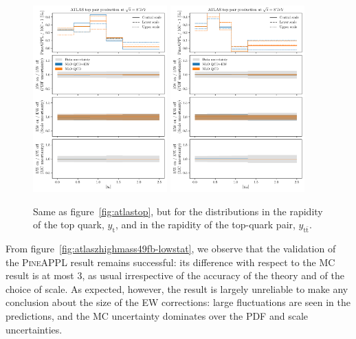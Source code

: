 \begin{figure}[!p]
    \centering
    \includegraphics[width=0.46\textwidth]{figures/pineappl_ATLAS_TTB_DIFF_8TEV_LJ_TRAP}
    \includegraphics[width=0.46\textwidth]{figures/pineappl_ATLAS_TTB_DIFF_8TEV_LJ_TTRAP}\\
    \caption{Same as figure~\ref{fig:atlastop}, but for the distributions
      in the rapidity of the top quark, $y_{\mathrm{t}}$, and in the rapidity of
      the top-quark pair, $y_{\mathrm{t}\bar{\mathrm{t}}}$.}
    \label{fig:atlastop-rap}
\end{figure}

From figure~\ref{fig:atlaszhighmass49fb-lowstat}, we observe that the validation
of the \textsc{PineAPPL} result remains successful: its difference with respect
to the MC result is at most \SI{3}{\permille}, as usual irrespective of the
accuracy of the theory and of the choice of scale. As expected, however, the
result is largely unreliable to make any conclusion about the size of the EW
corrections: large fluctuations are seen in the predictions, and the MC
uncertainty dominates over the PDF and scale uncertainties.

